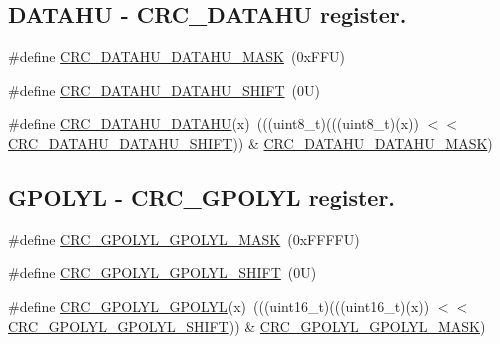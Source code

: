 \subsection*{D\+A\+T\+A\+HU -\/ C\+R\+C\+\_\+\+D\+A\+T\+A\+HU register.}
\begin{DoxyCompactItemize}
\item 
\#define \mbox{\hyperlink{group___c_r_c___register___masks_ga1dadbb252b94eae6d58efd4955a57eb2}{C\+R\+C\+\_\+\+D\+A\+T\+A\+H\+U\+\_\+\+D\+A\+T\+A\+H\+U\+\_\+\+M\+A\+SK}}~(0x\+F\+F\+U)
\item 
\#define \mbox{\hyperlink{group___c_r_c___register___masks_ga171e0d5a315574e858cf58e22957f131}{C\+R\+C\+\_\+\+D\+A\+T\+A\+H\+U\+\_\+\+D\+A\+T\+A\+H\+U\+\_\+\+S\+H\+I\+FT}}~(0\+U)
\item 
\#define \mbox{\hyperlink{group___c_r_c___register___masks_gae1736710c36588af1ecc3b6ecb3707e1}{C\+R\+C\+\_\+\+D\+A\+T\+A\+H\+U\+\_\+\+D\+A\+T\+A\+HU}}(x)~(((uint8\+\_\+t)(((uint8\+\_\+t)(x)) $<$$<$ \mbox{\hyperlink{group___c_r_c___register___masks_ga171e0d5a315574e858cf58e22957f131}{C\+R\+C\+\_\+\+D\+A\+T\+A\+H\+U\+\_\+\+D\+A\+T\+A\+H\+U\+\_\+\+S\+H\+I\+FT}})) \& \mbox{\hyperlink{group___c_r_c___register___masks_ga1dadbb252b94eae6d58efd4955a57eb2}{C\+R\+C\+\_\+\+D\+A\+T\+A\+H\+U\+\_\+\+D\+A\+T\+A\+H\+U\+\_\+\+M\+A\+SK}})
\end{DoxyCompactItemize}
\subsection*{G\+P\+O\+L\+YL -\/ C\+R\+C\+\_\+\+G\+P\+O\+L\+YL register.}
\begin{DoxyCompactItemize}
\item 
\#define \mbox{\hyperlink{group___c_r_c___register___masks_ga7512a0f84b048e7a54207f9a7e619494}{C\+R\+C\+\_\+\+G\+P\+O\+L\+Y\+L\+\_\+\+G\+P\+O\+L\+Y\+L\+\_\+\+M\+A\+SK}}~(0x\+F\+F\+F\+F\+U)
\item 
\#define \mbox{\hyperlink{group___c_r_c___register___masks_gaf4e5ed1d1478c1a6c8c5681e2b1d24aa}{C\+R\+C\+\_\+\+G\+P\+O\+L\+Y\+L\+\_\+\+G\+P\+O\+L\+Y\+L\+\_\+\+S\+H\+I\+FT}}~(0\+U)
\item 
\#define \mbox{\hyperlink{group___c_r_c___register___masks_ga5eb41c10ffbf64defaef2101a9036e32}{C\+R\+C\+\_\+\+G\+P\+O\+L\+Y\+L\+\_\+\+G\+P\+O\+L\+YL}}(x)~(((uint16\+\_\+t)(((uint16\+\_\+t)(x)) $<$$<$ \mbox{\hyperlink{group___c_r_c___register___masks_gaf4e5ed1d1478c1a6c8c5681e2b1d24aa}{C\+R\+C\+\_\+\+G\+P\+O\+L\+Y\+L\+\_\+\+G\+P\+O\+L\+Y\+L\+\_\+\+S\+H\+I\+FT}})) \& \mbox{\hyperlink{group___c_r_c___register___masks_ga7512a0f84b048e7a54207f9a7e619494}{C\+R\+C\+\_\+\+G\+P\+O\+L\+Y\+L\+\_\+\+G\+P\+O\+L\+Y\+L\+\_\+\+M\+A\+SK}})
\end{DoxyCompactItemize}

